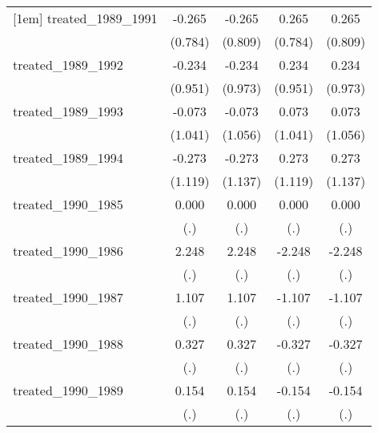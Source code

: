 {\begin{tabular}{l*{4}{c}}
[1em]
treated\_1989\_1991&      -0.265         &      -0.265         &       0.265         &       0.265         \\
            &     (0.784)         &     (0.809)         &     (0.784)         &     (0.809)         \\
[1em]
treated\_1989\_1992&      -0.234         &      -0.234         &       0.234         &       0.234         \\
            &     (0.951)         &     (0.973)         &     (0.951)         &     (0.973)         \\
[1em]
treated\_1989\_1993&      -0.073         &      -0.073         &       0.073         &       0.073         \\
            &     (1.041)         &     (1.056)         &     (1.041)         &     (1.056)         \\
[1em]
treated\_1989\_1994&      -0.273         &      -0.273         &       0.273         &       0.273         \\
            &     (1.119)         &     (1.137)         &     (1.119)         &     (1.137)         \\
[1em]
treated\_1990\_1985&       0.000         &       0.000         &       0.000         &       0.000         \\
            &         (.)         &         (.)         &         (.)         &         (.)         \\
[1em]
treated\_1990\_1986&       2.248         &       2.248         &      -2.248         &      -2.248         \\
            &         (.)         &         (.)         &         (.)         &         (.)         \\
[1em]
treated\_1990\_1987&       1.107         &       1.107         &      -1.107         &      -1.107         \\
            &         (.)         &         (.)         &         (.)         &         (.)         \\
[1em]
treated\_1990\_1988&       0.327         &       0.327         &      -0.327         &      -0.327         \\
            &         (.)         &         (.)         &         (.)         &         (.)         \\
[1em]
treated\_1990\_1989&       0.154         &       0.154         &      -0.154         &      -0.154         \\
            &         (.)         &         (.)         &         (.)         &         (.)         \\

\end{tabular}}
